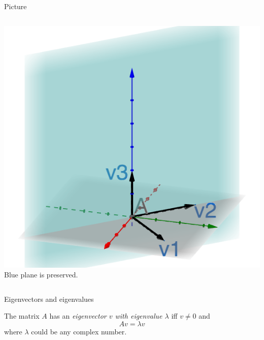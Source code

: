 \documentclass{beamer}
\begin{document}
\begin{frame}{Picture}
\begin{columns}
	\includegraphics[scale=0.4]{3d-rotation.png}
	Blue plane is preserved.
\end{columns}
\end{frame}

\begin{frame}{Eigenvectors and eigenvalues}
\begin{definition}
The matrix $A$ has an \emph{eigenvector $v$ with eigenvalue $\lambda$} iff $v\neq 0$ and 
\begin{equation*}
	Av = \lambda v
\end{equation*}
where $\lambda$ could be any complex number.
\end{definition}
\end{frame}
\end{document}
